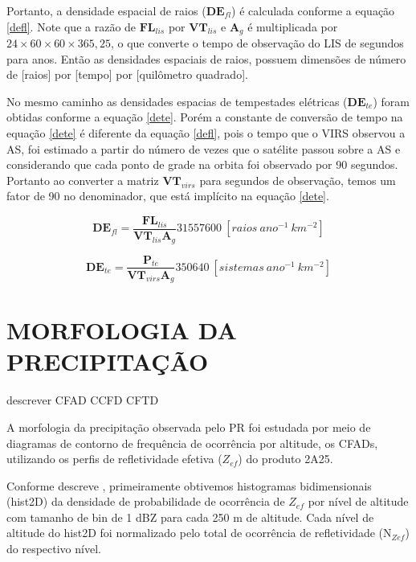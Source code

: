 Portanto, a densidade espacial de raios ($\mathbf{DE}_{fl}$) é calculada conforme a equação \ref{defl}. Note que a razão de $\mathbf{FL}_{lis}$ por $\mathbf{VT}_{lis}$ e $\mathbf{A}_g$ é multiplicada por $24\times60\times60\times365,25$, o que converte o tempo de observação do LIS de segundos para anos. Então as densidades espaciais de raios, possuem dimensões de número de [raios] por [tempo] por [quilômetro quadrado].

No mesmo caminho as densidades espacias de tempestades elétricas ($\mathbf{DE}_{te}$) foram obtidas conforme a equação \ref{dete}. Porém a constante de conversão de tempo na equação \ref{dete} é diferente da equação \ref{defl}, pois o tempo que o VIRS observou a AS, foi estimado a partir do número de vezes que o satélite passou sobre a AS e considerando que cada ponto de grade na orbita foi observado por 90 segundos. Portanto ao converter a matriz $\mathbf{VT}_{virs}$ para segundos de observação, temos um fator de 90 no denominador, que está implícito na equação \ref{dete}.



\begin{equation}
\mathbf{DE}_{fl} = \frac{\mathbf{FL}_{lis}}{\mathbf{VT}_{lis} \mathbf{A}_g} 31557600 ~[raios~ano^{-1}~km^{-2}]    
\label{defl}
\end{equation}

\begin{equation}
\mathbf{DE}_{te} = \frac{\mathbf{P}_{te}}{\mathbf{VT}_{virs} \mathbf{A}_g} 350640 ~[sistemas~ano^{-1}~km^{-2}]    
\label{dete}
\end{equation}


\section{MORFOLOGIA DA PRECIPITAÇÃO}

descrever CFAD CCFD CFTD

A morfologia da precipitação observada pelo PR foi estudada por meio de diagramas de contorno de frequência de ocorrência por altitude, os CFADs, utilizando os perfis de refletividade efetiva ($Z_{ef}$) do produto 2A25.

Conforme descreve \cite{yuter1995}, primeiramente obtivemos histogramas bidimensionais (hist2D) da densidade de probabilidade de ocorrência de $Z_{ef}$ por nível de altitude com tamanho de bin de 1 dBZ para cada 250 m de altitude. Cada nível de altitude do hist2D foi normalizado pelo total de ocorrência de refletividade (N$_{Zef}$) do respectivo nível.

